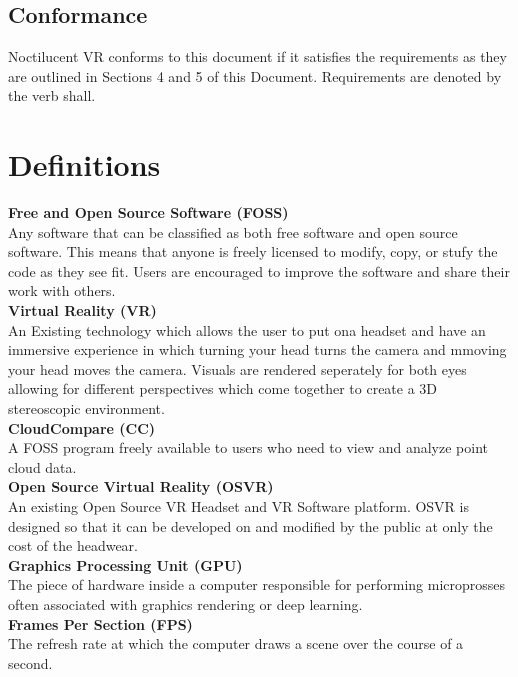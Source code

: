 \documentclass{article}
\begin{document}
\subsection{Conformance}

Noctilucent VR conforms to this document if it satisfies the requirements as they are outlined in Sections 4 and 5 of this Document. Requirements are denoted by the verb shall.

\section{Definitions}

{\parindent0pt
\textbf{Free and Open Source Software (FOSS)}\\

Any software that can be classified as both free software and open source software.
This means that anyone is freely licensed to modify, copy, or stufy the code as they see fit.
Users are encouraged to improve the software and share their work with others.\\

\textbf{Virtual Reality (VR)}\\

An Existing technology which allows the user to put ona headset and have an immersive experience in which turning your  head turns the camera and mmoving your head moves the camera.
Visuals are rendered seperately for both eyes allowing for different perspectives which come together to create a 3D stereoscopic environment.\\

\textbf{CloudCompare (CC)}\\

A FOSS program freely available to users who need to view and analyze point cloud data.\\

\textbf{Open Source Virtual Reality (OSVR)}\\

An existing Open Source VR Headset and VR Software platform.
OSVR is designed so that it can be developed on and modified by the public at only the cost of the headwear.\\

\textbf{Graphics Processing Unit (GPU)}\\

The piece of hardware inside a computer responsible for performing microprosses often associated with graphics rendering or deep learning.\\

\textbf{Frames Per Section (FPS)}\\

The refresh rate at which the computer draws a scene over the course of a second.\\
}
\end{document}
